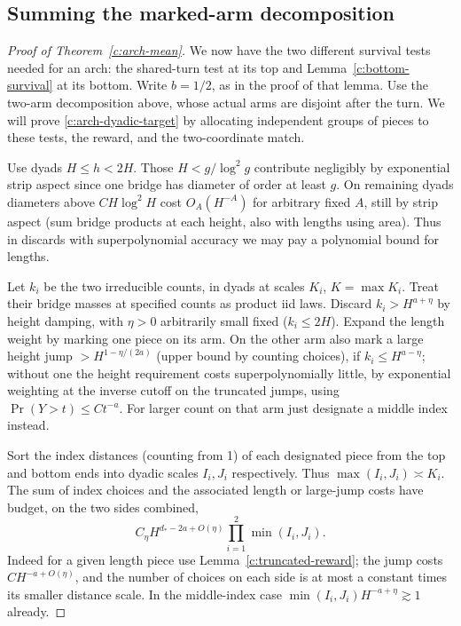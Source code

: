 \documentclass[11pt]{article}
\numberwithin{equation}{section}
\theoremstyle{definition}\newtheorem{definition}[theorem]{Definition}
\theoremstyle{remark}\newtheorem{remark}[theorem]{Remark}
\begin{document}
\subsection{Summing the marked-arm decomposition}
\begin{proof}[Proof of Theorem~\ref{c:arch-mean}]
We now have the two different survival tests needed for an arch: the
shared-turn test at its top and Lemma~\ref{c:bottom-survival} at its bottom.
Write $b=1/2$, as in the proof of that lemma.
Use the two-arm decomposition above, whose actual arms are disjoint after
the turn. We will prove \eqref{c:arch-dyadic-target} by allocating independent
groups of pieces to these tests, the reward, and the two-coordinate match.

Use dyads \(H\le h<2H\). Those \(H<g/\log^2 g\) contribute negligibly by exponential strip aspect since one bridge has diameter of order at least \(g\). On remaining dyads diameters above \(C H\log^2 H\) cost \(O_A(H^{-A})\) for arbitrary fixed \(A\), still by strip aspect (sum bridge products at each height, also with lengths using area). Thus in discards with superpolynomial accuracy we may pay a polynomial bound for lengths.

Let \(k_i\) be the two irreducible counts, in dyads at scales \(K_i\), \(K=\max K_i\). Treat their bridge masses at specified counts as product iid laws. Discard \(k_i>H^{a+\eta}\) by height damping, with \(\eta>0\) arbitrarily small fixed (\(k_i\le2H\)). Expand the length weight by marking one piece on its arm. On the other arm also mark a large height jump \(>H^{1-\eta/(2a)}\) (upper bound by counting choices), if \(k_i\le H^{a-\eta}\); without one the height requirement costs superpolynomially little, by exponential weighting at the inverse cutoff on the truncated jumps, using \(\Pr(Y>t)\le C t^{-a}\). For larger count on that arm just designate a middle index instead.

Sort the index distances (counting from 1) of each designated piece from the top and bottom ends into dyadic scales \(I_i,J_i\) respectively. Thus \(\max(I_i,J_i)\asymp K_i\). The sum of index choices and the associated length or large-jump costs have budget, on the two sides combined,
\[
 C_\eta H^{d_*-2a+O(\eta)}
       \prod_{i=1}^2\min(I_i,J_i).
\]
Indeed for a given length piece use Lemma~\ref{c:truncated-reward}; the jump costs \(C H^{-a+O(\eta)}\), and the number of choices on each side is at most a constant times its smaller distance scale. In the middle-index case \(\min(I_i,J_i)H^{-a+\eta}\gtrsim1\) already.


\end{proof}
\end{document}
